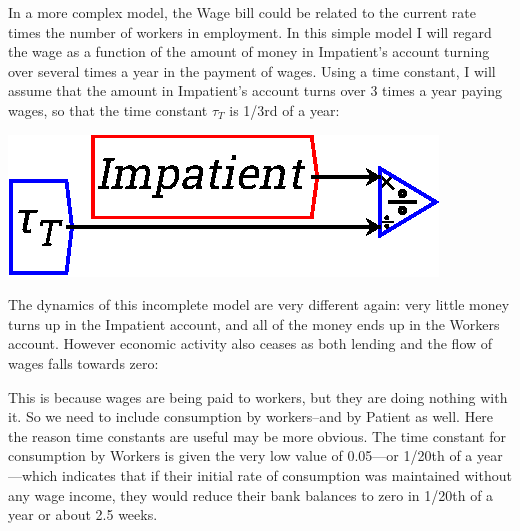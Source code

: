 In a more complex model, the Wage bill could be related to the current
rate times the number of workers in employment. In this simple model I
will regard the wage as a function of the amount of money in
Impatient's account turning over several times a year in the payment
of wages. Using a time constant, I will assume that the amount in
Impatient's account turns over 3 times a year paying wages, so that
the time constant $\tau_T$ is 1/3rd of a year:

\begin{center}
  \includegraphics{images/NewItem176.eps}
\end{center}

The dynamics of this incomplete model are very different again: very
little money turns up in the Impatient account, and all of the money
ends up in the Workers account. However economic activity also ceases
as both lending and the flow of wages falls towards zero:

\begin{center}
\end{center}

This is because wages are being paid to workers, but they are doing
nothing with it. So we need to include consumption by workers--and by
Patient as well. Here the reason time constants are useful may be more
obvious. The time constant for consumption by Workers is given the
very low value of 0.05---or 1/20th of a year---which indicates that if
their initial rate of consumption was maintained without any wage
income, they would reduce their bank balances to zero in 1/20th of a
year or about 2.5 weeks.

